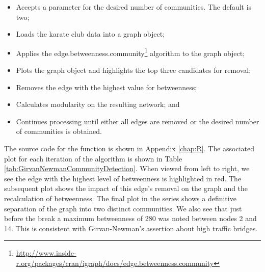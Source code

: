 \documentclass[letterpaper,11pt]{report}
\begin{document}
\begin{savenotes}
\begin{itemize}
\item Accepts a parameter for the desired number of communities. The default is two;
\item Loads the karate club data into a graph object;
\item Applies the edge.betweenness.community\footnote{\url{http://www.inside-r.org/packages/cran/igraph/docs/edge.betweenness.community}} algorithm to the graph object;
\item Plots the graph object and highlights the top three candidates for removal;
\item Removes the edge with the highest value for betweenness;
\item Calculates modularity on the resulting network; and
\item Continues processing until either all edges are removed or the desired number of communities is obtained.
\end{itemize}

\indent{}The source code for the function is shown in Appendix \ref{chap:R}. The associated plot for each iteration of the algorithm is shown in Table \ref{tab:GirvanNewmanCommunityDetection}. When viewed from left to right, we see the edge with the highest level of betweenness is highlighted in red. The subsequent plot shows the impact of this edge's removal on the graph and the recalculation of betweenness. The final plot in the series shows a definitive separation of the graph into two distinct communities. We also see that just before the break a maximum betweenness of 280 was noted between nodes 2 and 14. This is consistent with Girvan-Newman's assertion about high traffic bridges.


\end{savenotes}
\end{document}
